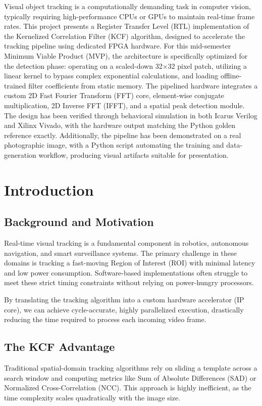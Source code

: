 \documentclass[a4paper,12pt]{report}
\begin{document}
Visual object tracking is a computationally demanding task in computer vision, typically requiring high-performance CPUs or GPUs to maintain real-time frame rates. This project presents a Register Transfer Level (RTL) implementation of the Kernelized Correlation Filter (KCF) algorithm, designed to accelerate the tracking pipeline using dedicated FPGA hardware. For this mid-semester Minimum Viable Product (MVP), the architecture is specifically optimized for the detection phase: operating on a scaled-down 32$\times$32 pixel patch, utilizing a linear kernel to bypass complex exponential calculations, and loading offline-trained filter coefficients from static memory. The pipelined hardware integrates a custom 2D Fast Fourier Transform (FFT) core, element-wise conjugate multiplication, 2D Inverse FFT (IFFT), and a spatial peak detection module. The design has been verified through behavioral simulation in both Icarus Verilog and Xilinx Vivado, with the hardware output matching the Python golden reference exactly. Additionally, the pipeline has been demonstrated on a real photographic image, with a Python script automating the training and data-generation workflow, producing visual artifacts suitable for presentation.

\pagebreak
\tableofcontents
\pagebreak
\listoffigures
\pagebreak
\chapter{Introduction}
\section{Background and Motivation}
Real-time visual tracking is a fundamental component in robotics, autonomous navigation, and smart surveillance systems. The primary challenge in these domains is tracking a fast-moving Region of Interest (ROI) with minimal latency and low power consumption. Software-based implementations often struggle to meet these strict timing constraints without relying on power-hungry processors.

By translating the tracking algorithm into a custom hardware accelerator (IP core), we can achieve cycle-accurate, highly parallelized execution, drastically reducing the time required to process each incoming video frame.

\section{The KCF Advantage}
Traditional spatial-domain tracking algorithms rely on sliding a template across a search window and computing metrics like Sum of Absolute Differences (SAD) or Normalized Cross-Correlation (NCC). This approach is highly inefficient, as the time complexity scales quadratically with the image size.
\end{document}
